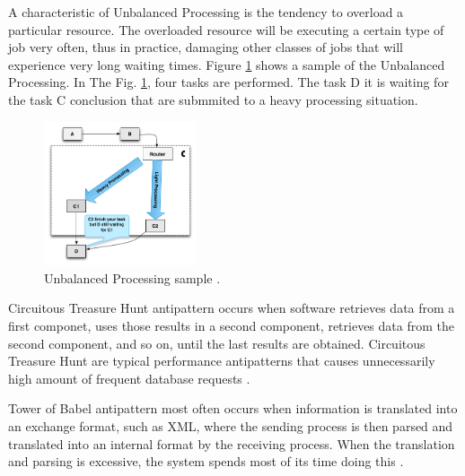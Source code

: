 A characteristic of Unbalanced Processing is the tendency to overload a particular resource. The overloaded resource will be executing a certain type of job very often, thus in practice, damaging other classes
of jobs that will experience very long waiting times.  Figure \ref{fig:unbalanced}  shows a sample of the Unbalanced Processing. In The Fig. \ref{fig:unbalanced}, four tasks are performed. The task D it is waiting for the task C conclusion that are submmited to a heavy processing situation. 


\begin{figure}[h]
\centering
\includegraphics[width=0.4\textwidth]{./images/unbalanced.png}
\caption{Unbalanced Processing sample \cite{Wert2013a}. }
\label{fig:unbalanced}
\end{figure}

Circuitous Treasure Hunt antipattern occurs when software retrieves data from a first componet, uses those results in a second component, retrieves data from the second component, and so on, until the last results are obtained. Circuitous Treasure Hunt 
are typical performance antipatterns that causes unnecessarily high amount of frequent database requests \cite{Wert2014}. 

Tower of Babel antipattern most often occurs when information is translated into an exchange format, such as XML, where the sending process is then parsed and translated into an internal format by the receiving process. When the translation and parsing is excessive, the system spends most
of its time doing this \cite{Wert2014}.

